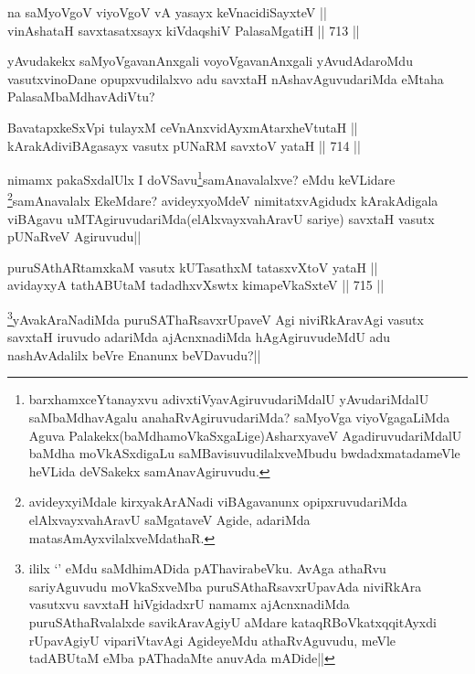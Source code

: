 \begin{shl}
na saMyoVgoV viyoVgoV vA yasayx keVnacidiSayxteV || \\
vinAshataH savxtasatxsayx kiVdaqshiV PalasaMgatiH ||  713 ||  
\end{shl}

\begin{artha}
yAvudakekx saMyoVgavanAnxgali voyoVgavanAnxgali yAvudAdaroMdu vasutxvinoDane opupxvudilalxvo adu savxtaH nAshavAguvudariMda eMtaha PalasaMbaMdhavAdiVtu?
\end{artha}


\begin{shl}
BavatapxkeSxV\s pi tulayxM ceVnAnxvidAyxmAtarxheVtutaH || \\
kArakAdiviBAgasayx vasutx pUNaRM savxtoV yataH ||  714 ||  
\end{shl}

\begin{artha}
nimamx pakaSxdalUlx I doVSavu\footnote{barxhamxceYtanayxvu adivxtiVyavAgiruvudariMdalU yAvudariMdalU saMbaMdhavAgalu anahaRvAgiruvudariMda? saMyoVga viyoVgagaLiMda Aguva Palakekx(baMdhamoVkaSxgaLige)AsharxyaveV AgadiruvudariMdalU baMdha moVkASxdigaLu saMBavisuvudilalxveMbudu bwdadxmatadameVle heVLida deVSakekx samAnavAgiruvudu.}samAnavalalxve? eMdu keVLidare \footnote{avideyxyiMdale kirxyakArANadi viBAgavanunx opipxruvudariMda elAlxvayxvahAravU saMgataveV Agide, adariMda matasAmAyxvilalxveMdathaR.}samAnavalalx EkeMdare? avideyxyoMdeV nimitatxvAgidudx kArakAdigala viBAgavu uMTAgiruvudariMda(elAlxvayxvahAravU sariye) savxtaH vasutx pUNaRveV Agiruvudu||
\end{artha}


\begin{shl}
puruSAthARtamxkaM vasutx kUTasathxM tatasxvXtoV yataH || \\
avidayxyA tathABUtaM tadadhxvXswtx kimapeVkaSxteV ||  715 ||  
\end{shl}

\begin{artha}
\footnote{ililx `\stext' eMdu saMdhimADida pAThavirabeVku. AvAga athaRvu sariyAguvudu moVkaSxveMba puruSAthaRsavxrUpavAda niviRkAra vasutxvu savxtaH hiVgidadxrU namamx ajAcnxnadiMda puruSAthaRvalalxde savikAravAgiyU aMdare kataqRBoVkatxqqitAyxdi rUpavAgiyU vipariVtavAgi AgideyeMdu athaRvAguvudu, meVle tadABUtaM eMba pAThadaMte anuvAda mADide||}yAvakAraNadiMda puruSAThaRsavxrUpaveV Agi niviRkAravAgi vasutx savxtaH iruvudo adariMda ajAcnxnadiMda hAgAgiruvudeMdU adu nashAvAdalilx beVre Enanunx beVDavudu?||
\end{artha}

